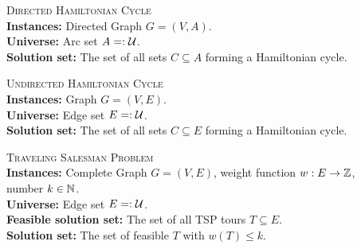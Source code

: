 \begin{samepage}
    \begin{mdframed}
    	\begin{description}
        \item[]\textsc{Directed Hamiltonian Cycle}\hfill\\
        \textbf{Instances:} Directed Graph $G = (V, A)$.\\
        \textbf{Universe:} Arc set $A =: \mathcal{U}$.\\
        \textbf{Solution set:} The set of all sets $C \subseteq A$ forming a Hamiltonian cycle.
    	\end{description}
    \end{mdframed}
\end{samepage}

\begin{samepage}
    \begin{mdframed}
    	\begin{description}  
        \item[]\textsc{Undirected Hamiltonian Cycle}\hfill\\
        \textbf{Instances:} Graph $G = (V, E)$.\\
        \textbf{Universe:} Edge set $E =: \mathcal{U}$.\\
        \textbf{Solution set:} The set of all sets $C \subseteq E$ forming a Hamiltonian cycle.
    	\end{description}
    \end{mdframed}
\end{samepage}

\begin{samepage}
    \begin{mdframed}
    	\begin{description}
        \item[]\textsc{Traveling Salesman Problem}\hfill\\
        \textbf{Instances:} Complete Graph $G = (V, E)$, weight function $w: E \rightarrow \mathbb{Z} $, number $k \in \mathbb{N}$.\\
        \textbf{Universe:} Edge set $E =: \mathcal{U}$.\\
        \textbf{Feasible solution set:} The set of all TSP tours $T\subseteq E$.\\
        \textbf{Solution set:} The set of feasible $T$ with $w(T) \leq k$.
    	\end{description}
    \end{mdframed}
\end{samepage}

